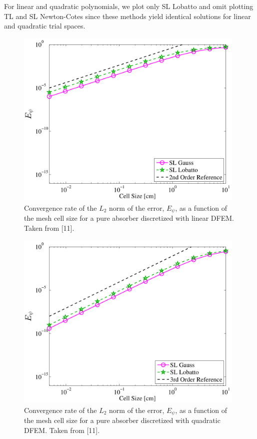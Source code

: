 For linear and quadratic polynomials, we plot only SL Lobatto and omit plotting TL and SL Newton-Cotes since these methods yield identical solutions for linear and quadratic trial spaces.  
\begin{figure}[!htp]
\centering
\includegraphics[width=11cm]{chapter2_constant_xs/Linear_L2_err-eps-converted-to.pdf}
\caption{Convergence rate of the $L_2$ norm of the error, $E_{\psi}$,  as a function of the mesh cell size for a pure absorber discretized with linear DFEM.   Taken from [11].}
\label{fig:multi_L2_p1}
\end{figure}
\begin{figure}[!htp]
\centering
\includegraphics[width=11cm]{chapter2_constant_xs/Quadratic_L2_err-eps-converted-to.pdf}
\caption{Convergence rate of the $L_2$ norm of the error, $E_{\psi}$,  as a function of the mesh cell size for a pure absorber discretized with quadratic DFEM.  Taken from [11].}
\label{fig:multi_L2_p2}
\end{figure}
